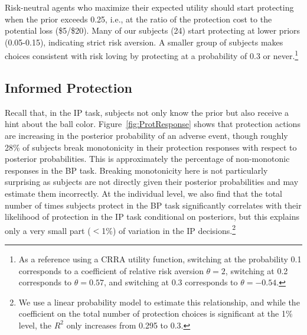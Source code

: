 \documentclass[12pt,a4paper]{article}
\begin{document}

Risk-neutral agents who maximize their expected utility should start protecting when the prior exceeds 0.25, i.e., at the ratio of the protection cost to the potential loss (\$5/\$20). Many of our subjects (24) start protecting at lower priors (0.05-0.15), indicating strict risk aversion.  A smaller group of subjects makes choices consistent with risk loving by protecting at a probability of 0.3 or never.\footnote{As a reference using a CRRA utility function, switching at the probability 0.1 corresponds to a coefficient of relative risk aversion $\theta=2$, switching at 0.2 corresponds to $\theta=0.57$, and switching at 0.3 corresponds to $\theta=-0.54$.} 


\subsection{Informed Protection}

Recall that, in the IP task, subjects not only know the prior but also receive a hint about the ball color. 
Figure~\ref{fig:ProtResponse} shows that protection actions are increasing in the posterior probability of an adverse event, though roughly 28\% of subjects break monotonicity in their protection responses with respect to posterior probabilities. This is approximately the percentage of non-monotonic responses in the BP task.  Breaking monotonicity here is not particularly surprising as subjects are not directly given their posterior probabilities and may estimate them incorrectly. At the individual level, we also find that the total number of times subjects protect in the BP task significantly correlates with their likelihood of protection in the IP task conditional on posteriors, but this explains only a very small part ($<$1\%) of variation in the IP decisions.\footnote{We use a linear probability model to estimate this relationship, and while the coefficient on the total number of protection choices is significant at the 1\% level, the $R^2$ only increases from 0.295 to 0.3.} 


\end{document}
